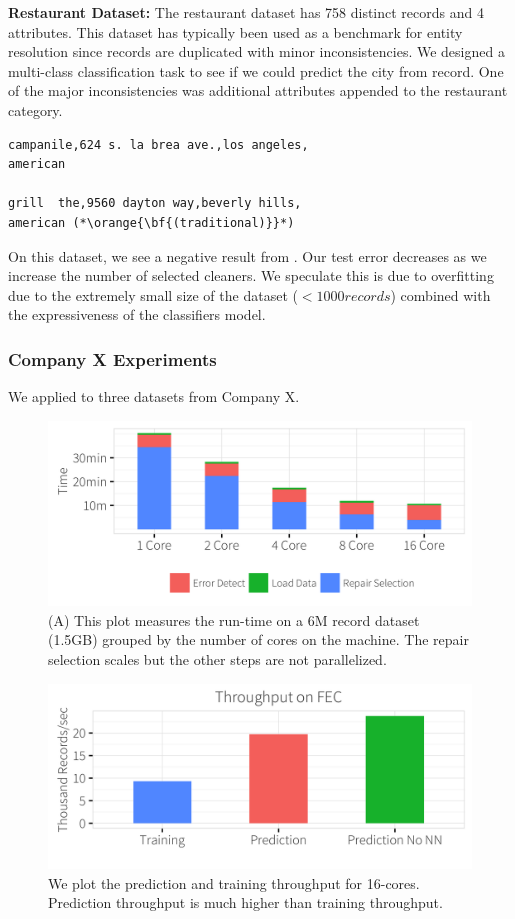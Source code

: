 \vspace{0.5em}\noindent\textbf{Restaurant Dataset: } The restaurant dataset has 758 distinct records and 4 attributes. This dataset has typically been used as a benchmark for entity resolution since records are duplicated with minor inconsistencies.
We designed a multi-class classification task to see if we could predict the city from record.
One of the major inconsistencies was additional attributes appended to the restaurant category.

\begin{lstlisting}
campanile,624 s. la brea ave.,los angeles,
american

grill  the,9560 dayton way,beverly hills,
american (*\orange{\bf{(traditional)}}*)
\end{lstlisting}

On this dataset, we see a negative result from \sys. Our test error decreases as we increase the number of selected cleaners. We speculate this is due to overfitting due to the extremely small size of the dataset  ($<1000 records$) combined with the expressiveness of the classifiers model.

\subsubsection{Company X Experiments}
We applied \sys to three datasets from Company X.


\begin{figure}[t]
\centering
\includegraphics[width=0.8\columnwidth]{exp/runtime.png}
\caption{(A) This plot measures the run-time on a 6M record dataset (1.5GB) grouped by the number of cores on the machine. The repair selection scales but the other steps are not parallelized.\label{exp:runtime}}
\end{figure}

\begin{figure}[t]
\centering
\includegraphics[width=0.8\columnwidth]{exp/runtime2.png}
\caption{We plot the prediction and training throughput for 16-cores. Prediction throughput is much higher than training throughput.\label{exp:tp}}
\end{figure}

